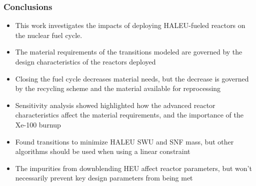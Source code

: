 \begin{frame}
      \frametitle{Conclusions}
      \begin{itemize}
        \item This work investigates the impacts of deploying \gls{HALEU}-fueled 
              reactors on the nuclear fuel cycle.
        \item<2-> The material requirements of the transitions modeled are governed 
              by the design characteristics of the reactors deployed
        \item<2-> Closing the fuel cycle decreases material needs, but the 
              decrease is governed by the recycling scheme and the 
              material available for reprocessing
        \item<3-> Sensitivity analysis showed highlighted how the 
              advanced reactor characteristics affect the material requirements, and 
              the importance of the Xe-100 burnup
        \item<3-> Found transitions to minimize \gls{HALEU} \gls{SWU} 
              and \gls{SNF} mass, but other algorithms should 
              be used when using a linear constraint
        \item<4-> The impurities from downblending \gls{HEU} affect 
              reactor parameters, but won't necessarily prevent key design 
              parameters from being met
      \end{itemize}
\end{frame}


